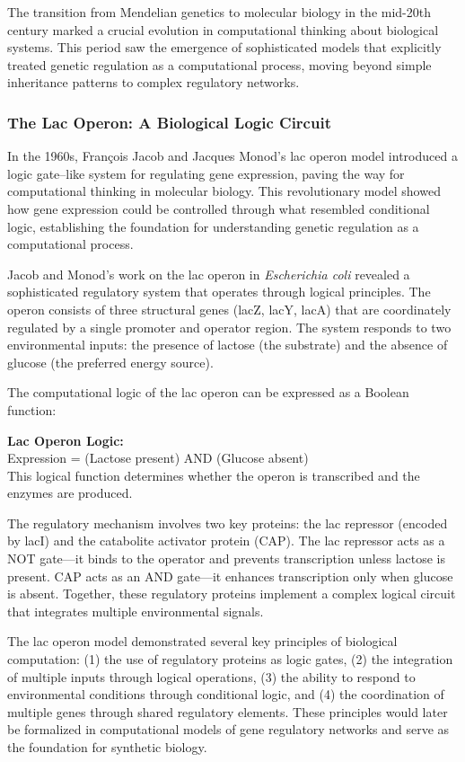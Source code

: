 \documentclass[11pt]{article}
\begin{document}
The transition from Mendelian genetics to molecular biology in the mid-20th century marked a crucial evolution in computational thinking about biological systems. This period saw the emergence of sophisticated models that explicitly treated genetic regulation as a computational process, moving beyond simple inheritance patterns to complex regulatory networks.

\subsubsection{The Lac Operon: A Biological Logic Circuit}

In the 1960s, François Jacob and Jacques Monod's lac operon model introduced a logic gate–like system for regulating gene expression, paving the way for computational thinking in molecular biology. This revolutionary model showed how gene expression could be controlled through what resembled conditional logic, establishing the foundation for understanding genetic regulation as a computational process.

Jacob and Monod's work on the lac operon in \textit{Escherichia coli} revealed a sophisticated regulatory system that operates through logical principles. The operon consists of three structural genes (lacZ, lacY, lacA) that are coordinately regulated by a single promoter and operator region. The system responds to two environmental inputs: the presence of lactose (the substrate) and the absence of glucose (the preferred energy source).

The computational logic of the lac operon can be expressed as a Boolean function:

\textbf{Lac Operon Logic:}\\
Expression = (Lactose present) AND (Glucose absent)\\
This logical function determines whether the operon is transcribed and the enzymes are produced.

The regulatory mechanism involves two key proteins: the lac repressor (encoded by lacI) and the catabolite activator protein (CAP). The lac repressor acts as a NOT gate—it binds to the operator and prevents transcription unless lactose is present. CAP acts as an AND gate—it enhances transcription only when glucose is absent. Together, these regulatory proteins implement a complex logical circuit that integrates multiple environmental signals.

The lac operon model demonstrated several key principles of biological computation: (1) the use of regulatory proteins as logic gates, (2) the integration of multiple inputs through logical operations, (3) the ability to respond to environmental conditions through conditional logic, and (4) the coordination of multiple genes through shared regulatory elements. These principles would later be formalized in computational models of gene regulatory networks and serve as the foundation for synthetic biology.
\end{document}
